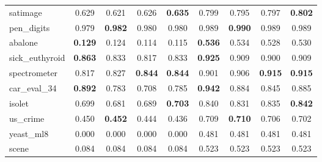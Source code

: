 \begin{figure}[ht]
\begin{tabular}{p{22mm}|*4{p{14mm}}|*4{p{14mm}}}
        satimage&\multicolumn{1}{c}{0.629}&\multicolumn{1}{c}{0.621}&\multicolumn{1}{c}{0.626}&\multicolumn{1}{c|}{\textbf{0.635}}&\multicolumn{1}{c}{0.799}&\multicolumn{1}{c}{0.795}&\multicolumn{1}{c}{0.797}&\multicolumn{1}{c}{\textbf{0.802}}\\
        pen\_digits&\multicolumn{1}{c}{0.979}&\multicolumn{1}{c}{\textbf{0.982}}&\multicolumn{1}{c}{0.980}&\multicolumn{1}{c|}{0.980}&\multicolumn{1}{c}{0.989}&\multicolumn{1}{c}{\textbf{0.990}}&\multicolumn{1}{c}{0.989}&\multicolumn{1}{c}{0.989}\\
        abalone&\multicolumn{1}{c}{\textbf{0.129}}&\multicolumn{1}{c}{0.124}&\multicolumn{1}{c}{0.114}&\multicolumn{1}{c|}{0.115}&\multicolumn{1}{c}{\textbf{0.536}}&\multicolumn{1}{c}{0.534}&\multicolumn{1}{c}{0.528}&\multicolumn{1}{c}{0.530}\\
        sick\_euthyroid&\multicolumn{1}{c}{\textbf{0.863}}&\multicolumn{1}{c}{0.833}&\multicolumn{1}{c}{0.817}&\multicolumn{1}{c|}{0.833}&\multicolumn{1}{c}{\textbf{0.925}}&\multicolumn{1}{c}{0.909}&\multicolumn{1}{c}{0.900}&\multicolumn{1}{c}{0.909}\\
        spectrometer&\multicolumn{1}{c}{0.817}&\multicolumn{1}{c}{0.827}&\multicolumn{1}{c}{\textbf{0.844}}&\multicolumn{1}{c|}{\textbf{0.844}}&\multicolumn{1}{c}{0.901}&\multicolumn{1}{c}{0.906}&\multicolumn{1}{c}{\textbf{0.915}}&\multicolumn{1}{c}{\textbf{0.915}}\\
        car\_eval\_34&\multicolumn{1}{c}{\textbf{0.892}}&\multicolumn{1}{c}{0.783}&\multicolumn{1}{c}{0.708}&\multicolumn{1}{c|}{0.785}&\multicolumn{1}{c}{\textbf{0.942}}&\multicolumn{1}{c}{0.884}&\multicolumn{1}{c}{0.845}&\multicolumn{1}{c}{0.885}\\
        isolet&\multicolumn{1}{c}{0.699}&\multicolumn{1}{c}{0.681}&\multicolumn{1}{c}{0.689}&\multicolumn{1}{c|}{\textbf{0.703}}&\multicolumn{1}{c}{0.840}&\multicolumn{1}{c}{0.831}&\multicolumn{1}{c}{0.835}&\multicolumn{1}{c}{\textbf{0.842}}\\
        us\_crime&\multicolumn{1}{c}{0.450}&\multicolumn{1}{c}{\textbf{0.452}}&\multicolumn{1}{c}{0.444}&\multicolumn{1}{c|}{0.436}&\multicolumn{1}{c}{0.709}&\multicolumn{1}{c}{\textbf{0.710}}&\multicolumn{1}{c}{0.706}&\multicolumn{1}{c}{0.702}\\
        yeast\_ml8&\multicolumn{1}{c}{0.000}&\multicolumn{1}{c}{0.000}&\multicolumn{1}{c}{0.000}&\multicolumn{1}{c|}{0.000}&\multicolumn{1}{c}{0.481}&\multicolumn{1}{c}{0.481}&\multicolumn{1}{c}{0.481}&\multicolumn{1}{c}{0.481}\\
        scene&\multicolumn{1}{c}{0.084}&\multicolumn{1}{c}{0.084}&\multicolumn{1}{c}{0.084}&\multicolumn{1}{c|}{0.084}&\multicolumn{1}{c}{0.523}&\multicolumn{1}{c}{0.523}&\multicolumn{1}{c}{0.523}&\multicolumn{1}{c}{0.523}\\

\end{tabular}
\end{figure}
